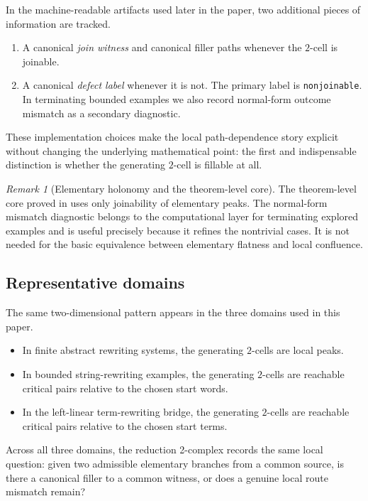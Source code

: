 \documentclass[11pt]{article}
\numberwithin{equation}{section}
\theoremstyle{definition}
\theoremstyle{remark}
\newtheorem{remark}[theorem]{Remark}
\begin{document}
In the machine-readable artifacts used later in the paper, two additional pieces of information are tracked.
\begin{enumerate}
    \item A canonical \emph{join witness} and canonical filler paths whenever the $2$-cell is joinable.
    \item A canonical \emph{defect label} whenever it is not. The primary label is \texttt{nonjoinable}. In terminating bounded examples we also record normal-form outcome mismatch as a secondary diagnostic.
\end{enumerate}
These implementation choices make the local path-dependence story explicit without changing the underlying mathematical point: the first and indispensable distinction is whether the generating $2$-cell is fillable at all.

\begin{remark}[Elementary holonomy and the theorem-level core]
\label{rem:holonomy-vs-formal-core}
The theorem-level core proved in  uses only joinability of elementary peaks. The normal-form mismatch diagnostic belongs to the computational layer for terminating explored examples and is useful precisely because it refines the nontrivial cases. It is not needed for the basic equivalence between elementary flatness and local confluence.
\end{remark}

\subsection{Representative domains}

The same two-dimensional pattern appears in the three domains used in this paper.
\begin{itemize}
    \item In finite abstract rewriting systems, the generating $2$-cells are local peaks.
    \item In bounded string-rewriting examples, the generating $2$-cells are reachable critical pairs relative to the chosen start words.
    \item In the left-linear term-rewriting bridge, the generating $2$-cells are reachable critical pairs relative to the chosen start terms.
\end{itemize}
Across all three domains, the reduction 2-complex records the same local question: given two admissible elementary branches from a common source, is there a canonical filler to a common witness, or does a genuine local route mismatch remain?
\end{document}
